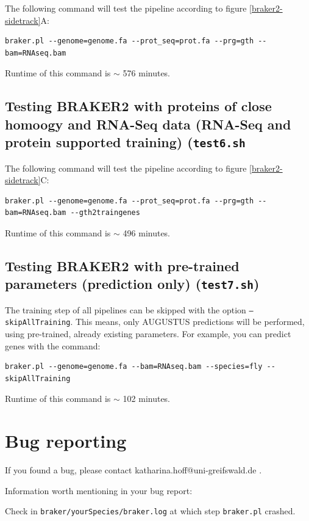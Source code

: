 \documentclass[a4paper,10pt]{report}
\begin{document}
The following command will test the pipeline according to figure \ref{braker2-sidetrack}A:

\begin{verbatim}
braker.pl --genome=genome.fa --prot_seq=prot.fa --prg=gth --bam=RNAseq.bam
\end{verbatim}

Runtime of this command is $\sim$ 576 minutes.

\section{Testing BRAKER2 with proteins of close homoogy and RNA-Seq data (RNA-Seq and protein supported training) (\texttt{test6.sh}}

The following command will test the pipeline according to figure \ref{braker2-sidetrack}C:

\begin{verbatim}
braker.pl --genome=genome.fa --prot_seq=prot.fa --prg=gth --bam=RNAseq.bam --gth2traingenes
\end{verbatim}

Runtime of this command is $\sim$ 496 minutes.

\section{Testing BRAKER2 with pre-trained parameters (prediction only) (\texttt{test7.sh})}

The training step of all pipelines can be skipped with the option \texttt{--skipAllTraining}. This means, only AUGUSTUS predictions will be performed, using pre-trained, already existing parameters. For example, you can predict genes with the command:

\begin{verbatim}
braker.pl --genome=genome.fa --bam=RNAseq.bam --species=fly --skipAllTraining
\end{verbatim}

Runtime of this command is $\sim$ 102 minutes.

\chapter{Bug reporting}

If you found a bug, please contact katharina.hoff@uni-greifswald.de .

Information worth mentioning in your bug report:

Check in \texttt{braker/yourSpecies/braker.log} at which step \texttt{braker.pl} crashed.
\end{document}
